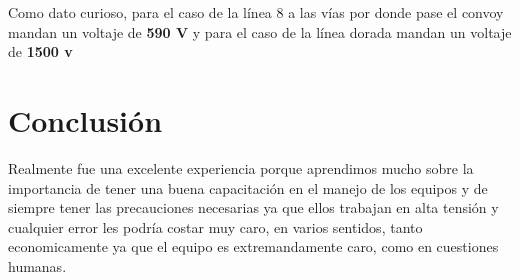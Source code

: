 \documentclass{mylib/reporte}
\begin{document}
Como dato curioso, para el caso de la línea 8 a las vías por donde pase el convoy mandan un voltaje de \textbf{590 V} y para el caso de la línea dorada mandan un voltaje de \textbf{1500 v}

\newpage
\section{Conclusión}

Realmente fue una excelente experiencia porque aprendimos mucho sobre la importancia de tener una buena capacitación en el manejo de los equipos y de siempre tener las precauciones necesarias ya que ellos trabajan en alta tensión y cualquier error les podría costar muy caro, en varios sentidos, tanto economicamente ya que el equipo es extremandamente caro, como en cuestiones humanas.

\end{document}
